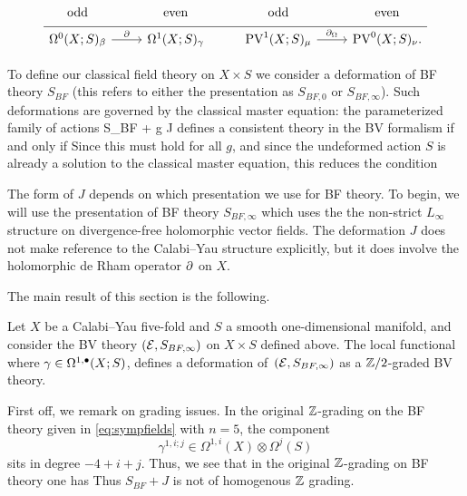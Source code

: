 \begin{equation}
  \label{eq:sympfields} 
  \begin{tikzcd}[row sep = 1 ex]
    {\rm odd} & {\rm even} & {\rm odd} & {\rm even} \\ \hline
    \Omega^{0}(X;S)_\beta \ar[r, "\del"] & \Omega^{1}(X;S)_\gamma & 
     \PV^{1}(X; S)_\mu \ar[r, "\div"] & \PV^{0}(X; S)_\nu.
\end{tikzcd}
\end{equation}

\parsec

To define our classical field theory on $X \times S$ we consider  a deformation of BF theory $S_{BF}$ (this refers to either the presentation as $S_{BF,0}$ or $S_{BF,\infty}$). 
Such deformations are governed by the classical master equation: the parameterized family of actions 
\beqn\label{eqn:defaction}
S_{BF} + g J
\eeqn
defines a consistent theory in the BV formalism if and only if
Since this must hold for all $g$, and since the undeformed action $S$ is already a solution to the classical master equation, this reduces the condition

The form of $J$ depends on which presentation we use for BF theory.
To begin, we will use the presentation of BF theory $S_{BF, \infty}$ which uses the the non-strict $L_\infty$ structure on divergence-free holomorphic vector fields.
The deformation $J$ does not make reference to the Calabi--Yau structure explicitly, but it does involve the holomorphic de Rham operator $\partial$ on $X$. 

The main result of this section is the following. 

\begin{thm}
\label{thm:dfn}
Let $X$ be a Calabi--Yau five-fold and $S$ a smooth one-dimensional manifold, and consider the BV theory $(\mathcal E, S_{BF,\infty})$ on $X \times S$ defined above. The local functional 
  where $\gamma \in \Omega^{1,\bullet}(X;S)$, defines a deformation of~$(\mathcal E,S_{BF,\infty})$ as a $\mathbb{Z}/2$-graded BV theory.
\end{thm}

\parsec[]

First off, we remark on grading issues. 
In the original $\mathbb{Z}$-grading on the BF theory given in \eqref{eq:sympfields} with $n=5$, the component 
\[
\gamma^{1,i;j} \in \Omega^{1,i}(X) \otimes \Omega^j(S) 
\]
sits in degree $-4+i+j$. 
Thus, we see that in the original $\mathbb{Z}$-grading on BF theory one has
Thus $S_{BF} + J$ is not of homogenous $\mathbb Z$ grading.


